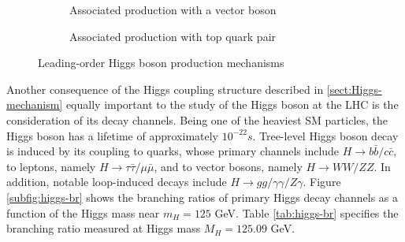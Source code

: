 \begin{figure}[h]
\begin{subfigure}[b]{0.48\textwidth}
        \caption{Associated production with a vector boson}
        \label{subfig:VH-higgs}
    \end{subfigure}
    \begin{subfigure}[b]{0.48\textwidth}
        \centering
        \caption{Associated production with top quark pair}
        \label{subfig:ttH-signature}
    \end{subfigure}
    \caption{Leading-order Higgs boson production mechanisms}
    \label{fig:higgs-production}
\end{figure} 

Another consequence of the Higgs coupling structure described in \ref{sect:Higgs-mechanism} equally important to the study of the Higgs boson at the LHC is the consideration of its decay channels. 
Being one of the heaviest SM particles, the Higgs boson has a lifetime of approximately $10^{-22}s$. 
Tree-level Higgs boson decay is induced by its coupling to quarks, whose primary channels include $H\rightarrow b\bar{b}/c\bar{c}$, to leptons, namely $H\rightarrow \tau\bar{\tau}/\mu\bar{\mu}$, and to vector bosons, namely $H\rightarrow WW/ZZ$. 
In addition, notable loop-induced decays include $H\rightarrow gg/\gamma\gamma/Z\gamma$. 
Figure \ref{subfig:higgs-br} shows the branching ratios of primary Higgs decay channels as a function of the Higgs mass near $m_H=125$ GeV. 
Table \ref{tab:higgs-br} specifies the branching ratio measured at Higgs mass $M_H=125.09$ GeV.

